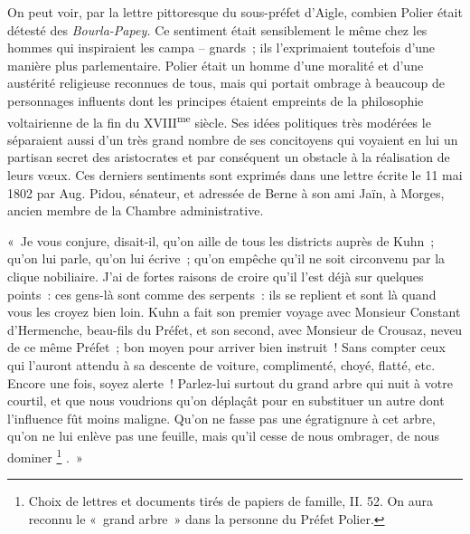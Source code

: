 \documentclass[french,twoside]{book} %
\newenvironment{quoteblock}%
  {\begin{quoting}}
  {\end{quoting}}
\newenvironment{quotebar}{%
    \def\FrameCommand{{\color{rubric!10!}\vrule width 0.5em} \hspace{0.9em}}%
    \def\OuterFrameSep{\itemsep} %
    \MakeFramed {\advance\hsize-\width \FrameRestore}
  }%
  {%
    \endMakeFramed
  }
\renewenvironment{quoteblock}%
  {%
    \savenotes
    \setstretch{0.9}
    \normalfont
    \begin{quotebar}
  }
  {%
    \end{quotebar}
    \spewnotes
  }
\begin{document}
\noindent On peut voir, par la lettre pittoresque du sous-préfet d’Aigle, combien Polier était détesté des \emph{Bourla-Papey.} Ce sentiment était sensiblement le même chez les hommes qui inspiraient les campa – gnards ; ils l’exprimaient toutefois d’une manière plus parlementaire. Polier était un homme d’une moralité et d’une austérité religieuse reconnues de tous, mais qui portait ombrage à beaucoup de personnages influents dont les principes étaient empreints de la philosophie voltairienne de la fin du XVIII\textsuperscript{me} siècle. Ses idées politiques très modérées le séparaient aussi d’un très grand nombre de ses concitoyens qui voyaient en lui un partisan secret des aristocrates et par conséquent un obstacle à la réalisation de leurs vœux. Ces derniers sentiments sont exprimés dans une lettre écrite le 11 mai 1802 par Aug. Pidou, sénateur, et adressée de Berne à son ami Jaïn, à Morges, ancien membre de la Chambre administrative.\par

\begin{quoteblock}
 \noindent « Je vous conjure, disait-il, qu’on aille de tous les districts auprès de Kuhn ; qu’on lui parle, qu’on lui écrive ; qu’on empêche qu’il ne soit circonvenu par la clique nobiliaire. J’ai de fortes raisons de croire qu’il l’est déjà sur quelques points : ces gens-là sont comme des serpents : ils se replient et sont là quand vous les croyez bien loin. Kuhn a fait son premier voyage avec Monsieur Constant d’Hermenche, beau-fils du Préfet, et son second, avec Monsieur de Crousaz, neveu de ce même Préfet ; bon moyen pour arriver bien instruit ! Sans compter ceux qui l’auront attendu à sa descente de voiture, complimenté, choyé, flatté, etc. Encore une fois, soyez alerte ! Parlez-lui surtout du grand arbre qui nuit à votre courtil, et que nous voudrions qu’on déplaçât pour en substituer un autre dont l’influence fût moins maligne. Qu’on ne fasse pas une égratignure à cet arbre, qu’on ne lui enlève pas une feuille, mais qu’il cesse de nous ombrager, de nous dominer \footnote{Choix de lettres et documents tirés de papiers de famille, II. 52. On aura reconnu le « grand arbre » dans la personne du Préfet Polier.} . »
 \end{quoteblock}
\end{document}
